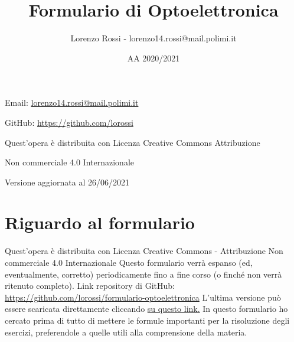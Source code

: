 \documentclass[9pt]{extarticle}
\title{\Huge{Formulario di Optoelettronica}}
\author{\Huge{Lorenzo Rossi - lorenzo14.rossi@mail.polimi.it}}
\date{\Huge{AA 2020/2021}}
\begin{document}
\maketitle

\vspace{25em}

\begin{doublespacing}\hypersetup{
    urlcolor=black,
  }
  \centerline{\Large{Email: \href{mailto://lorenzo14.rossi@mail.polimi.it}{lorenzo14.rossi@mail.polimi.it}}}
  \centerline{\Large{GitHub: \url{https://github.com/lorossi}}}

  \vspace{25em}

  \centerline{\Large{Quest'opera è distribuita con Licenza Creative Commons Attribuzione}}
  \centerline{\Large{Non commerciale 4.0 Internazionale \ccbynceu}}
  \centerline{\Large{Versione aggiornata al 26/06/2021}}
\end{doublespacing}

\newpage


\tableofcontents
\clearpage
{}
\newpage

\section{Riguardo al formulario}
Quest'opera è distribuita con Licenza Creative Commons - Attribuzione Non commerciale 4.0 Internazionale \ccbynceu \newline
Questo formulario verrà espanso (ed, eventualmente, corretto) periodicamente fino a fine corso (o finché non verrà ritenuto completo). \newline
Link repository di GitHub: \url{https://github.com/lorossi/formulario-optoelettronica} \newline
L'ultima versione può essere scaricata direttamente cliccando \href{https://github.com/lorossi/formulario-optoelettronica/raw/master/formulario-optoelettronica.pdf}{su questo link.} \newline
In questo formulario ho cercato prima di tutto di mettere le formule importanti per la risoluzione degli esercizi, preferendole a quelle utili alla comprensione della materia.
\end{document}
